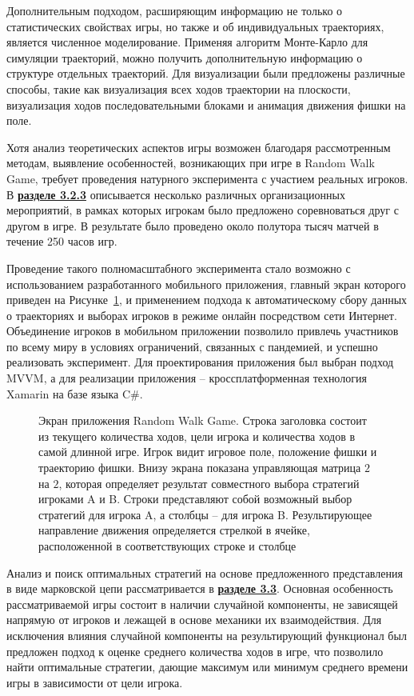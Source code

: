 Дополнительным подходом, расширяющим информацию не только о статистических свойствах игры, но также и об индивидуальных траекториях, является численное моделирование. Применяя алгоритм Монте-Карло для симуляции траекторий, можно получить дополнительную информацию о структуре отдельных траекторий. Для визуализации были предложены различные способы, такие как визуализация всех ходов траектории на плоскости, визуализация ходов последовательными блоками и анимация движения фишки на поле. 

Хотя анализ теоретических аспектов игры возможен благодаря рассмотренным методам, выявление особенностей, возникающих при игре в Random Walk Game, требует проведения натурного эксперимента с участием реальных игроков. В \underline{\textbf{разделе 3.2.3}} описывается несколько различных организационных мероприятий, в рамках которых игрокам было предложено соревноваться друг с другом в игре. В результате было проведено около полутора тысяч матчей в течение 250 часов игр.

Проведение такого полномасштабного эксперимента стало возможно с использованием разработанного мобильного приложения, главный экран которого приведен на Рисунке~\cref{fig:screenshot_game_field_ref}, и применением подхода к автоматическому сбору данных о траекториях и выборах игроков в режиме онлайн посредством сети Интернет. Объединение игроков в мобильном приложении позволило привлечь участников по всему миру в условиях ограничений, связанных с пандемией, и успешно реализовать эксперимент. Для проектирования приложения был выбран подход MVVM, а для реализации приложения -- кроссплатформенная технология Xamarin на базе языка C$\mathsf{\#}$.

\begin{figure}[ht]
    \caption{
        Экран приложения Random Walk Game. Строка заголовка состоит из текущего количества ходов, цели игрока и количества ходов в самой длинной игре. Игрок видит игровое поле, положение фишки и траекторию фишки. Внизу экрана показана управляющая матрица $2$ на $2$, которая определяет результат совместного выбора стратегий игроками A и B. Строки представляют собой возможный выбор стратегий для игрока A, а столбцы -- для игрока B. Результирующее направление движения  определяется стрелкой в ячейке, расположенной в соответствующих строке и столбце
    }\label{fig:screenshot_game_field_ref}
\end{figure}

Анализ и поиск оптимальных стратегий на основе предложенного представления в виде марковской цепи рассматривается в \underline{\textbf{разделе 3.3}}. Основная особенность рассматриваемой игры состоит в наличии случайной компоненты, не зависящей напрямую от игроков и лежащей в основе механики их взаимодействия. Для исключения влияния случайной компоненты на результирующий функционал был предложен подход к оценке среднего количества ходов в игре, что позволило найти оптимальные стратегии, дающие максимум или минимум среднего времени игры в зависимости от цели игрока.


